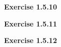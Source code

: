 \documentclass[12pt,oneside]{article}
\newenvironment{exercise}[1]{\vspace{.1in}\noindent\textbf{Exercise #1 \hspace{.05em}}}{}
\begin{document}

\begin{exercise}{1.5.10}

\end{exercise}


\begin{exercise}{1.5.11}

\end{exercise}


\begin{exercise}{1.5.12}

\end{exercise}


\end{document}
